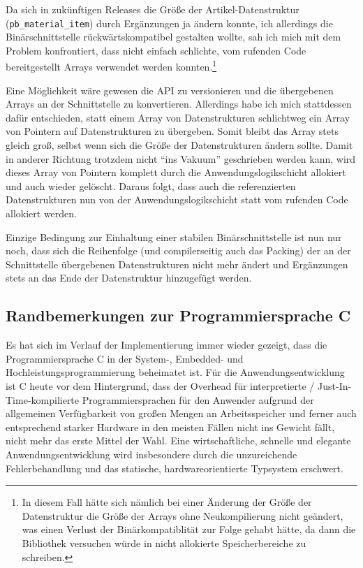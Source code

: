 Da sich in zukünftigen Releases die Größe der Artikel-Datenstruktur (\lstinline{pb_material_item}) durch Ergänzungen ja ändern
konnte, ich allerdings die Binärschnittstelle rückwärtskompatibel gestalten wollte, sah ich mich mit dem Problem
konfrontiert, dass nicht einfach schlichte, vom rufenden Code bereitgestellt Arrays verwendet werden konnten.\footnote{
In diesem Fall hätte sich nämlich bei einer Änderung der Größe der Datenstruktur die Größe der Arrays ohne Neukompilierung
nicht geändert, was einen Verlust der Binärkompatiblität zur Folge gehabt hätte, da dann die Bibliothek versuchen würde
in nicht allokierte Speicherbereiche zu schreiben.}

Eine Möglichkeit wäre gewesen die API zu versionieren und die übergebenen Arrays an der Schnittstelle zu konvertieren.
Allerdings habe ich mich stattdessen dafür entschieden, statt einem Array von Datenstrukturen schlichtweg ein Array
von Pointern auf Datenstrukturen zu übergeben. Somit bleibt das Array stets gleich groß, selbst wenn sich die Größe
der Datenstrukturen ändern sollte. Damit in anderer Richtung trotzdem nicht ``ins Vakuum'' geschrieben werden kann,
wird dieses Array von Pointern komplett durch die Anwendungslogikschicht allokiert und auch wieder gelöscht.
Daraus folgt, dass auch die referenzierten Datenstrukturen nun von der Anwendungslogikschicht statt vom rufenden Code
allokiert werden.

Einzige Bedingung zur Einhaltung einer stabilen Binärschnittstelle ist nun nur noch, dass sich die Reihenfolge (und
compilerseitig auch das Packing) der an der Schnittstelle übergebenen Datenstrukturen nicht mehr ändert und Ergänzungen
stets an das Ende der Datenstruktur hinzugefügt werden.

\subsection{Randbemerkungen zur Programmiersprache C}
Es hat sich im Verlauf der Implementierung immer wieder gezeigt, dass die Programmiersprache C in der System-, Embedded-
und Hochleistungsprogrammierung beheimatet ist. Für die Anwendungsentwicklung ist C heute vor dem Hintergrund, dass der
Overhead für interpretierte / Just-In-Time-kompilierte Programmiersprachen für den Anwender aufgrund der allgemeinen
Verfügbarkeit von großen Mengen an Arbeitsspeicher und ferner auch entsprechend starker Hardware in den meisten Fällen
nicht ins Gewicht fällt, nicht mehr das erste Mittel der Wahl. Eine wirtschaftliche, schnelle und elegante Anwendungsentwicklung
wird insbesondere durch die unzureichende Fehlerbehandlung und das statische, hardwareorientierte Typsystem erschwert.

